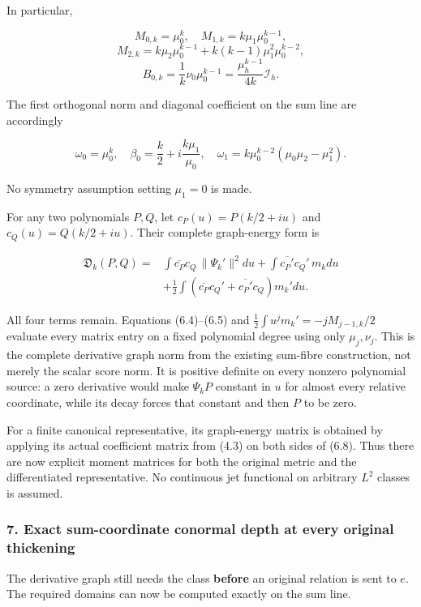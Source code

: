 In particular,

\[M_{0,k}=\mu_0^k,\quad M_{1,k}=k\mu_1\mu_0^{k-1},\]
\[M_{2,k}=k\mu_2\mu_0^{k-1}+k(k-1)\mu_1^2\mu_0^{k-2},\]
\[B_{0,k}=\frac1k\nu_0\mu_0^{k-1}=\frac{\mu_h^{k-1}}{4k}\mathcal I_h.\tag{6.6}\]

The first orthogonal norm and diagonal coefficient on the sum line are
accordingly

\[\omega_0=\mu_0^k,\quad
\beta_0=\frac k2+i\frac{k\mu_1}{\mu_0},\quad
\omega_1=k\mu_0^{k-2}(\mu_0\mu_2-\mu_1^2).\tag{6.7}\]

No symmetry assumption setting \(\mu_1=0\) is made.

For any two polynomials \(P,Q\), let \(c_P(u)=P(k/2+iu)\) and
\(c_Q(u)=Q(k/2+iu)\). Their complete graph-energy form is

\[\begin{aligned}
\mathfrak D_k(P,Q)={}&\int\overline{c_P}c_Q\,\|\Psi_k'\|^2du
+\int\overline{c_P'}c_Q'\,m_kdu\\
&+\frac12\int\left(\overline{c_P}c_Q'+\overline{c_P'}c_Q\right)m_k'du.
\end{aligned}\tag{6.8}\]

All four terms remain. Equations (6.4)--(6.5) and
\(\frac12\int u^jm_k'=-jM_{j-1,k}/2\) evaluate every matrix entry on a
fixed polynomial degree using only \(\mu_j,\nu_j\). This is the complete
derivative graph norm from the existing sum-fibre construction, not
merely the scalar score norm. It is positive definite on every nonzero
polynomial source: a zero derivative would make \(\Psi_kP\) constant in
\(u\) for almost every relative coordinate, while its decay forces that
constant and then \(P\) to be zero.

For a finite canonical representative, its graph-energy matrix is
obtained by applying its actual coefficient matrix from (4.3) on both
sides of (6.8). Thus there are now explicit moment matrices for both the
original metric and the differentiated representative. No continuous jet
functional on arbitrary \(L^2\) classes is assumed.

\subsubsection{7. Exact sum-coordinate conormal depth at every original
thickening}\label{cyclic_sum:exact-sum-coordinate-conormal-depth-at-every-original-thickening}

The derivative graph still needs the class \textbf{before} an original
relation is sent to \(e\). The required domains can now be computed
exactly on the sum line.

